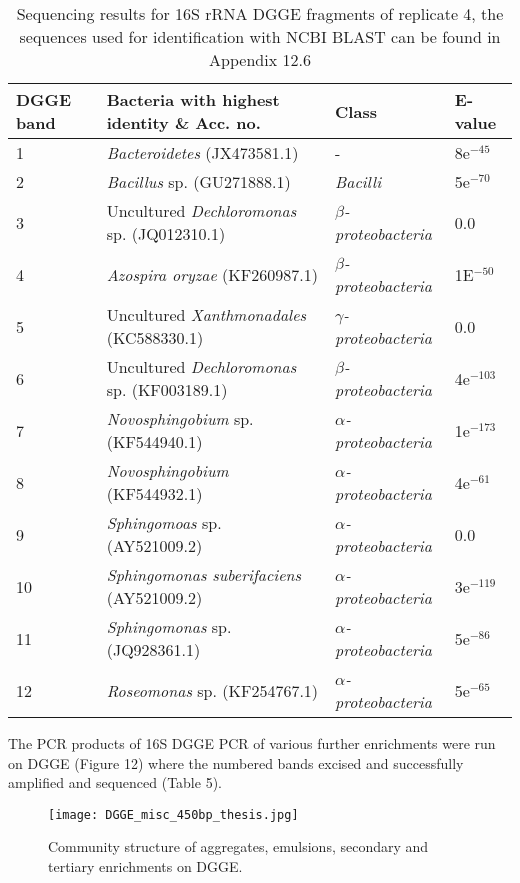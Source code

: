 \documentclass{article}
\begin{document}
\begin{table}
\begin{tabular}{ | l | p{7.8cm} | p{3cm} | l | }
\hline
DGGE band & Bacteria with highest identity \& Acc. no. & Class & E-value \\
\hline
1   &  \emph{Bacteroidetes} (JX473581.1) & - & 8e$^{-45}$ \\
\hline
2  & \emph{Bacillus} sp. (GU271888.1) & \emph{Bacilli} & 5e$^{-70}$ \\
\hline
3 & Uncultured \emph{Dechloromonas} sp. (JQ012310.1) & \emph{$\beta$-proteobacteria} & 0.0 \\
\hline
4 & \emph{Azospira oryzae} (KF260987.1) & \emph{$\beta$-proteobacteria} & 1E$^{-50}$ \\
\hline
5 & Uncultured \emph{Xanthmonadales} (KC588330.1) & \emph{$\gamma$-proteobacteria} & 0.0 \\
\hline
6 & Uncultured \emph{Dechloromonas} sp. (KF003189.1) & \emph{$\beta$-proteobacteria} & 4e$^{-103}$ \\
\hline
7 & \emph{Novosphingobium} sp. (KF544940.1) & \emph{$\alpha$-proteobacteria} & 1e$^{-173}$ \\
\hline
8 & \emph{Novosphingobium} (KF544932.1) & \emph{$\alpha$-proteobacteria} & 4e$^{-61}$ \\
\hline
9 & \emph{Sphingomoas} sp. (AY521009.2) & \emph{$\alpha$-proteobacteria} & 0.0 \\
\hline
10 & \emph{Sphingomonas suberifaciens} (AY521009.2) & \emph{$\alpha$-proteobacteria} & 3e$^{-119}$ \\
\hline
11 & \emph{Sphingomonas} sp. (JQ928361.1) & \emph{$\alpha$-proteobacteria} & 5e$^{-86}$ \\
\hline
12 & \emph{Roseomonas} sp.  (KF254767.1) & \emph{$\alpha$-proteobacteria} & 5e$^{-65}$ \\
\hline
\end{tabular}
\caption{Sequencing results for 16S rRNA DGGE fragments of replicate 4, the sequences used for identification with NCBI BLAST can be found in Appendix 12.6}
\end{table}

The PCR products of 16S DGGE PCR  of various further enrichments were run on DGGE (Figure 12) where the numbered bands excised and successfully amplified and sequenced (Table 5).

\begin{figure}
\texttt{[image: DGGE\_misc\_450bp\_thesis.jpg]}
\caption{Community structure of aggregates, emulsions, secondary and tertiary enrichments on DGGE.}
\end{figure}
\end{document}
